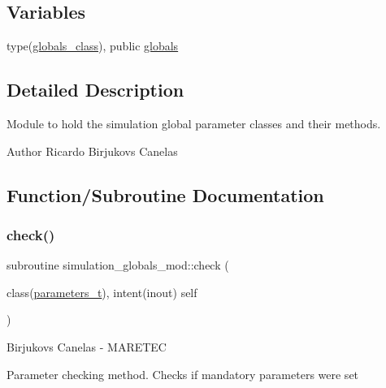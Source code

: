 \subsection*{Variables}
\begin{DoxyCompactItemize}
\item 
type(\hyperlink{structsimulation__globals__mod_1_1globals__class}{globals\+\_\+class}), public \hyperlink{namespacesimulation__globals__mod_a04123075b6de525703edb89697fc39e9}{globals}
\end{DoxyCompactItemize}


\subsection{Detailed Description}
Module to hold the simulation global parameter classes and their methods. 

\begin{DoxyAuthor}{Author}
Ricardo Birjukovs Canelas 
\end{DoxyAuthor}


\subsection{Function/\+Subroutine Documentation}
\mbox{\label{namespacesimulation__globals__mod_a41249abb5c33ef9e8bff448f0b3826fa}} 
\subsubsection{\texorpdfstring{check()}{check()}}
{\footnotesize\ttfamily subroutine simulation\+\_\+globals\+\_\+mod\+::check (\begin{DoxyParamCaption}\item[{class(\hyperlink{structsimulation__globals__mod_1_1parameters__t}{parameters\+\_\+t}), intent(inout)}]{self }\end{DoxyParamCaption})\hspace{0.3cm}{\ttfamily [private]}}



Birjukovs Canelas -\/ M\+A\+R\+E\+T\+EC 

Parameter checking method. Checks if mandatory parameters were set \mbox{\label{namespacesimulation__globals__mod_a68e871ed8e5d3930884e968c6fdafddc}} 
